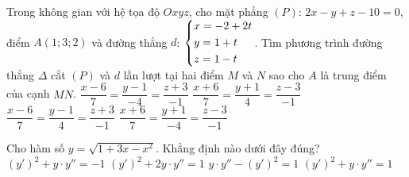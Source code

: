 \begin{ex}%
Trong không gian với hệ tọa độ $Oxyz$, cho mặt phẳng $(P)$: $2x-y+z-10=0$, điểm $A(1;3;2)$ và đường thẳng $d$: $\left\{\begin{aligned}& x=-2+2t\\&y=1+t\\& z=1-t\end{aligned}\right.$. Tìm phương trình đường thẳng $\Delta$ cắt $(P)$ và $d$ lần lượt tại hai điểm $M$ và $N$ sao cho $A$ là trung điểm của cạnh $MN$.
\choice
{$\dfrac{x-6}{7}=\dfrac{y-1}{-4}=\dfrac{z+3}{-1}$}
{\True $\dfrac{x+6}{7}=\dfrac{y+1}{4}=\dfrac{z-3}{-1}$}
{$\dfrac{x-6}{7}=\dfrac{y-1}{4}=\dfrac{z+3}{-1}$}
{$\dfrac{x+6}{7}=\dfrac{y+1}{-4}=\dfrac{z-3}{-1}$}
\end{ex}

\begin{ex}%
Cho hàm số $y=\sqrt{1+3x-x^2}$. Khẳng định nào dưới đây đúng?
\choice
{\True $(y')^2+y\cdot y''=-1$}
{$(y')^2+2y\cdot y''=1$}
{$y\cdot y''-(y')^2=1$}
{$(y')^2+y\cdot y''=1$}
\end{ex}

